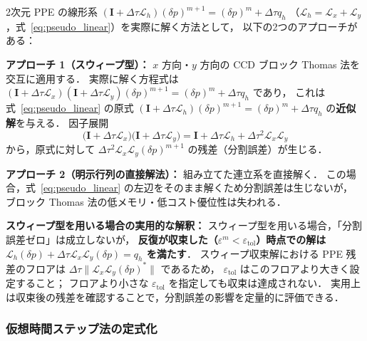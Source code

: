 \label{warn:ppe_splitting}
\begin{tcolorbox}[warnbox, title={2 次元求解における分割誤差について}]
2次元 PPE の線形系 $(\mathbf{I} + \Delta\tau\mathcal{L}_h)(\delta p)^{m+1} = (\delta p)^m + \Delta\tau q_h$
（$\mathcal{L}_h = \mathcal{L}_x + \mathcal{L}_y$，式~\eqref{eq:pseudo_linear}）を実際に解く方法として，
以下の2つのアプローチがある：

\textbf{アプローチ 1（スウィープ型）：} $x$ 方向・$y$ 方向の CCD ブロック Thomas 法を交互に適用する．
実際に解く方程式は $(\mathbf{I}+\Delta\tau\mathcal{L}_x)(\mathbf{I}+\Delta\tau\mathcal{L}_y)(\delta p)^{m+1} = (\delta p)^m + \Delta\tau q_h$ であり，
これは式~\eqref{eq:pseudo_linear} の原式 $(\mathbf{I}+\Delta\tau\mathcal{L}_h)(\delta p)^{m+1} = (\delta p)^m + \Delta\tau q_h$ の\textbf{近似解}を与える．
因子展開
\[
  \bigl(\mathbf{I}+\Delta\tau\mathcal{L}_x\bigr)\bigl(\mathbf{I}+\Delta\tau\mathcal{L}_y\bigr)
  = \mathbf{I} + \Delta\tau\mathcal{L}_h + \Delta\tau^2\mathcal{L}_x\mathcal{L}_y
\]
から，原式に対して $\Delta\tau^2\mathcal{L}_x\mathcal{L}_y(\delta p)^{m+1}$ の残差（分割誤差）が生じる．

\textbf{アプローチ 2（明示行列の直接解法）：} 組み立てた連立系を直接解く．
この場合，式~\eqref{eq:pseudo_linear} の左辺をそのまま解くため分割誤差は生じないが，
ブロック Thomas 法の低メモリ・低コスト優位性は失われる．

\textbf{スウィープ型を用いる場合の実用的な解釈：}
スウィープ型を用いる場合，「分割誤差ゼロ」は成立しないが，
\textbf{反復が収束した（$\varepsilon^m < \varepsilon_\text{tol}$）時点での解は $\mathcal{L}_h(\delta p) + \Delta\tau\mathcal{L}_x\mathcal{L}_y(\delta p) = q_h$ を満たす}．
スウィープ収束解における PPE 残差のフロアは $\Delta\tau\|\mathcal{L}_x\mathcal{L}_y(\delta p)^*\|$ であるため，
$\varepsilon_\text{tol}$ はこのフロアより大きく設定すること；
フロアより小さな $\varepsilon_\text{tol}$ を指定しても収束は達成されない．
実用上は収束後の残差を確認することで，分割誤差の影響を定量的に評価できる．
\end{tcolorbox}

\subsubsection{仮想時間ステップ法の定式化}
\label{sec:pseudo_formulation}

